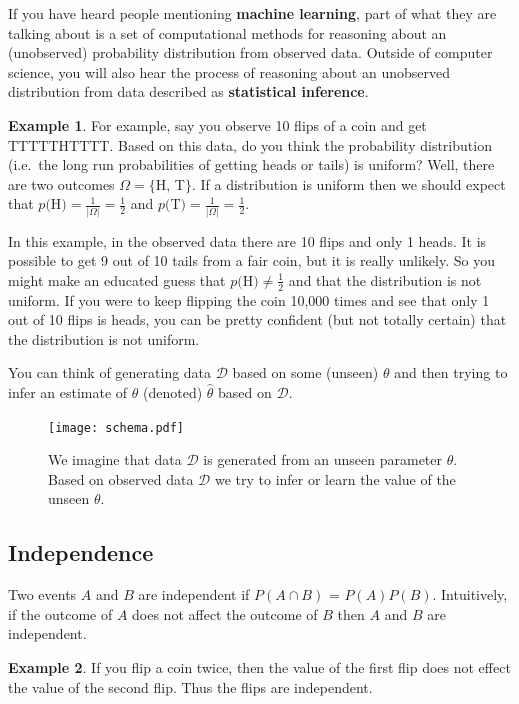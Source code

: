 \documentclass[]{article}
\theoremstyle{definition}
\newtheorem{exmp}{Example}[section]
\begin{document}
If you have heard people mentioning \textbf{machine learning}, part of what they are talking about is a set of computational methods for reasoning about an (unobserved) probability distribution from observed data. Outside of computer science, you will also hear the process of reasoning about an unobserved distribution from data described as \textbf{statistical inference}.

\begin{exmp}
For example, say you observe 10 flips of a coin and get TTTTTHTTTT. Based on this data, do you think the probability distribution (i.e.\ the long run probabilities of getting heads or tails) is uniform? Well, there are two outcomes $\Omega=\{$H, T$\}$. If a distribution is uniform then we should expect that $p($H$) = \frac{1}{\vert \Omega \vert} =  \frac{1}{2}$ and $p($T$) = \frac{1}{\vert \Omega \vert} = \frac{1}{2}$. 

In this example, in the observed data there are 10 flips and only 1 heads. It is possible to get 9 out of 10 tails from a fair coin, but it is really unlikely. So you might make an educated guess that $p($H$) \neq \frac{1}{2}$ and that the distribution is not uniform. If you were to keep flipping the coin 10,000 times and see that only 1 out of 10 flips is heads, you can be pretty confident (but not totally certain) that the distribution is not uniform. 
\end{exmp}

You can think of generating data $\mathcal{D}$ based on some (unseen) $\theta$ and then trying to infer an estimate of $\theta$ (denoted) $\hat{\theta}$ based on $\mathcal{D}$.

\begin{figure}[!ht]
     \centering
     \texttt{[image: schema.pdf]}
     \caption{We imagine that data $\mathcal{D}$ is generated from an unseen parameter $\theta$. Based on observed data $\mathcal{D}$ we try to infer or learn the value of the unseen $\theta$. }\label{f:gen_infer}
\end{figure}

\subsection{Independence}

Two events $A$ and $B$ are independent if $P(A \cap B)$ = $P(A)P(B)$. Intuitively, if the outcome of $A$ does not affect the outcome of $B$ then $A$ and $B$ are independent. 

\begin{exmp}
If you flip a coin twice, then the value of the first flip does not effect the value of the second flip. Thus the flips are independent.
\end{exmp} 
\end{document}
